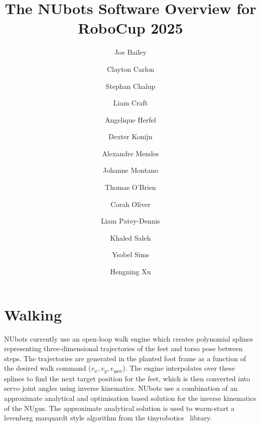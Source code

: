 \documentclass{llncs}
\begin{document}
%

\frontmatter          %
%
\pagestyle{headings}  %
%
%
\mainmatter              %
%
\title{The NUbots Software Overview for RoboCup 2025}
%
\author{Joe Bailey \and Clayton Carlon \and Stephan Chalup \and Liam Craft \and Angelique Herfel \and Dexter Konijn \and Alexandre Mendes \and Johanne Montano \and Thomas O'Brien \and Corah Oliver \and Liam Patey-Dennis \and Khaled Saleh \and Ysobel Sims \and Hengning Xu}
%
%
%
%

\maketitle              %

\section{Walking}


\medskip

NUbots currently use an open-loop walk engine which creates polynomial splines representing three-dimensional trajectories of the feet and torso pose between steps. The trajectories are generated in the planted foot frame as a function of the desired walk command ($v_x, v_y, v_{yaw}$). The engine interpolates over these splines to find the next target position for the feet, which is then converted into servo joint angles using inverse kinematics. NUbots use a combination of an approximate analytical and optimisation based solution for the inverse kinematics of the NUgus. The approximate analytical solution is used to warm-start a levenberg marquardt style algorithm from the tinyrobotics~\cite{tinyroboticsGit} library.
\end{document}
